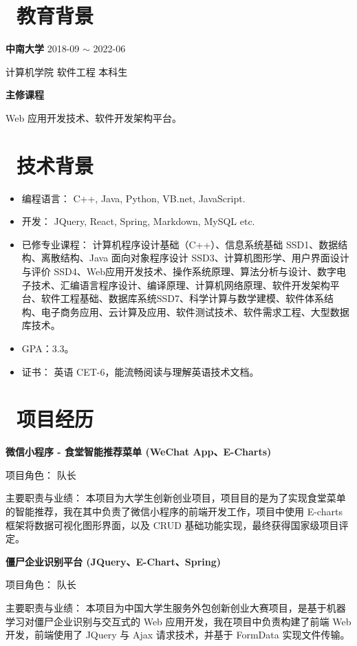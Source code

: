\documentclass[12pt, a4paper]{article}
\begin{document}
\section{\color{CVBlue}\faGraduationCap\  教育背景}

\textbf{中南大学} \hfill 2018-09 $\sim$ 2022-06

计算机学院 \quad 软件工程 \quad 本科生

\textbf{主修课程}

Web 应用开发技术、软件开发架构平台。

\section{\color{CVBlue}\faCogs\ 技术背景}
\begin{itemize}[parsep=0.5ex]
  \item 编程语言： C++, Java, Python, VB.net, JavaScript.
  \item 开发： JQuery, React, Spring, Markdown, MySQL etc.
  \item 已修专业课程： 计算机程序设计基础（C++）、信息系统基础 SSD1、数据结构、离散结构、Java 面向对象程序设计 SSD3、计算机图形学、用户界面设计与评价 SSD4、Web应用开发技术、操作系统原理、算法分析与设计、数字电子技术、汇编语言程序设计、编译原理、计算机网络原理、软件开发架构平台、软件工程基础、数据库系统SSD7、科学计算与数学建模、软件体系结构、电子商务应用、云计算及应用、软件测试技术、软件需求工程、大型数据库技术。
  \item GPA：3.3。
  \item 证书： 英语 CET-6，能流畅阅读与理解英语技术文档。
\end{itemize}

\section{\color{CVBlue}\faUsers\ 项目经历}

\textbf{微信小程序 - 食堂智能推荐菜单 (WeChat App、E-Charts)}

项目角色： 队长

主要职责与业绩： 本项目为大学生创新创业项目，项目目的是为了实现食堂菜单的智能推荐，我在其中负责了微信小程序的前端开发工作，项目中使用 E-charts 框架将数据可视化图形界面，以及 CRUD 基础功能实现，最终获得国家级项目评定。

\textbf{僵尸企业识别平台 (JQuery、E-Chart、Spring)}

项目角色： 队长

主要职责与业绩： 本项目为中国大学生服务外包创新创业大赛项目，是基于机器学习对僵尸企业识别与交互式的 Web 应用开发，我在项目中负责构建了前端 Web 开发，前端使用了 JQuery 与 Ajax 请求技术，并基于 FormData 实现文件传输。
\end{document}
